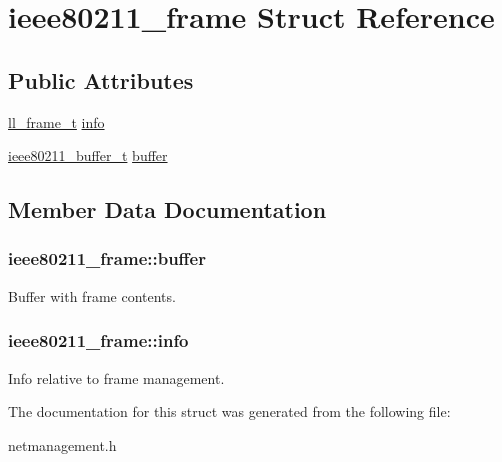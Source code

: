 \hypertarget{structieee80211__frame}{\section{ieee80211\-\_\-frame \-Struct \-Reference}
\label{structieee80211__frame}
}
\subsection*{\-Public \-Attributes}
\begin{DoxyCompactItemize}
\item 
\hyperlink{structll__frame}{ll\-\_\-frame\-\_\-t} \hyperlink{structieee80211__frame_a6a2918179c4c9dd8e8841c64a1252fd0}{info}
\item 
\hyperlink{structieee80211__frame__buffer}{ieee80211\-\_\-buffer\-\_\-t} \hyperlink{structieee80211__frame_a0d2f75f72850bc5ee9f994a35f910e87}{buffer}
\end{DoxyCompactItemize}


\subsection{\-Member \-Data \-Documentation}
\hypertarget{structieee80211__frame_a0d2f75f72850bc5ee9f994a35f910e87}{
\subsubsection[{buffer}]{ {\bf ieee80211\-\_\-frame\-::buffer}}}\label{structieee80211__frame_a0d2f75f72850bc5ee9f994a35f910e87}
\-Buffer with frame contents. \hypertarget{structieee80211__frame_a6a2918179c4c9dd8e8841c64a1252fd0}{
\subsubsection[{info}]{ {\bf ieee80211\-\_\-frame\-::info}}}\label{structieee80211__frame_a6a2918179c4c9dd8e8841c64a1252fd0}
\-Info relative to frame management. 

\-The documentation for this struct was generated from the following file\-:\begin{DoxyCompactItemize}
\item 
netmanagement.\-h\end{DoxyCompactItemize}
